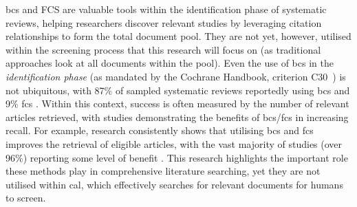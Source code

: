 \documentclass[10pt,oneside]{book}
\begin{document}
\gls*{bcs} and FCS are valuable tools within the identification phase of systematic reviews, helping researchers discover relevant studies by leveraging citation relationships to form the total document pool. They are not yet, however, utilised within the screening process that this research will focus on (as traditional approaches look at all documents within the pool). Even the use of \gls*{bcs} in the \emph{identification phase} (as mandated by the Cochrane Handbook, criterion C30~\cite{noauthor_mecir_nodate}) is not ubiquitous, with 87\% of sampled systematic reviews reportedly using \gls*{bcs} and 9\% \gls*{fcs} \cite{briscoe_conduct_2019}. Within this context, success is often measured by the number of relevant articles retrieved, with studies demonstrating the benefits of \gls*{bcs}/\gls*{fcs} in increasing recall. For example, research consistently shows that utilising \gls*{bcs} and \gls*{fcs} improves the retrieval of eligible articles, with the vast majority of studies (over 96\%) reporting some level of benefit \cite{hirt_citation_2023}. This research highlights the important role these methods play in comprehensive literature searching, yet they are not utilised within \gls*{cal}, which effectively searches for relevant documents for humans to screen.   
\end{document}
